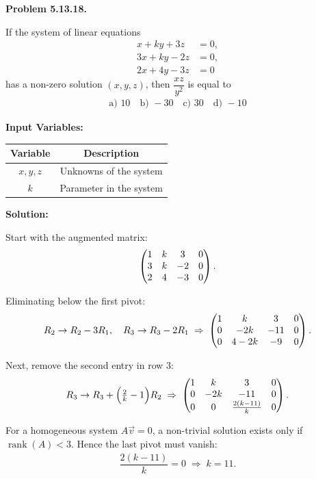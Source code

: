 \documentclass[12pt]{article}
\begin{document}
\textbf{Problem 5.13.18.} 

If the system of linear equations
\begin{align}
x + ky + 3z &= 0, \\
3x + ky - 2z &= 0, \\
2x + 4y - 3z &= 0
\end{align}
has a non-zero solution $(x,y,z)$, then $\dfrac{xz}{y^2}$ is equal to
\begin{align}
\text{a) } 10 \quad \text{b) } -30 \quad \text{c) } 30 \quad \text{d) } -10
\end{align}

\bigskip
\textbf{Input Variables:}

\begin{table}[H]
\centering
\begin{tabular}{|c|c|}
\hline
\textbf{Variable} & \textbf{Description} \\
\hline
$x,y,z$ & Unknowns of the system \\
\hline
$k$ & Parameter in the system \\
\hline
\end{tabular}
\end{table}

\bigskip
\textbf{Solution:}

Start with the augmented matrix:
\begin{align}
\begin{pmatrix}1 & k & 3 & 0 \\ 3 & k & -2 & 0 \\ 2 & 4 & -3 & 0\end{pmatrix}.
\end{align}

Eliminating below the first pivot:
\begin{align}
R_2 \to R_2 - 3R_1,\quad R_3 \to R_3 - 2R_1
\;\Rightarrow\;
\begin{pmatrix}1 & k & 3 & 0 \\ 0 & -2k & -11 & 0 \\ 0 & 4-2k & -9 & 0\end{pmatrix}.
\end{align}

Next, remove the second entry in row 3:
\begin{align}
R_3 \to R_3 + \Big(\tfrac{2}{k}-1\Big)R_2
\;\Rightarrow\;
\begin{pmatrix}1 & k & 3 & 0 \\ 0 & -2k & -11 & 0 \\ 0 & 0 & \tfrac{2(k-11)}{k} & 0\end{pmatrix}.
\end{align}

For a homogeneous system $A\vec{v}=0$, a non-trivial solution exists only if $\operatorname{rank}(A)<3$.  
Hence the last pivot must vanish:
\begin{align}
\dfrac{2(k-11)}{k}=0 \;\Rightarrow\; k=11.
\end{align}
\end{document}
